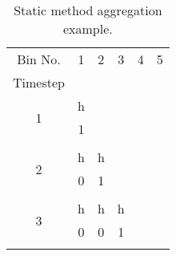 \documentclass[review,12pt]{elsarticle}
\begin{document}
\begin{table}[htbp!]
\centering
\caption{Static method aggregation example.}
\label{tab:static example}
\begin{tabular}{cccccc}
Bin No.                                  & 1                      & 2                      & 3                      & 4                        & 5                        \\
Timestep                                 &                        &                        &                        &                          &                          \\ \cline{1-2}
\multicolumn{1}{|c|}{\multirow{2}{*}{1}} & \multicolumn{1}{c|}{h} &                        &                        &                          &                          \\ \cline{2-2}
\multicolumn{1}{|c|}{}                   & \multicolumn{1}{c|}{1} &                        &                        &                          &                          \\ \cline{1-2}
                                         &                        &                        &                        &                          &                          \\ \cline{1-3}
\multicolumn{1}{|c|}{\multirow{2}{*}{2}} & \multicolumn{1}{c|}{h} & \multicolumn{1}{c|}{h} &                        &                          &                          \\ \cline{2-3}
\multicolumn{1}{|c|}{}                   & \multicolumn{1}{c|}{0} & \multicolumn{1}{c|}{1} &                        &                          &                          \\ \cline{1-3}
                                         &                        &                        &                        &                          &                          \\ \cline{1-4}
\multicolumn{1}{|c|}{\multirow{2}{*}{3}} & \multicolumn{1}{c|}{h} & \multicolumn{1}{c|}{h} & \multicolumn{1}{c|}{h} &                          &                          \\ \cline{2-4}
\multicolumn{1}{|c|}{}                   & \multicolumn{1}{c|}{0} & \multicolumn{1}{c|}{0} & \multicolumn{1}{c|}{1} &                          &                          \\ \cline{1-4}
                                         &                        &                        &                        &                          &                          \\ \cline{1-5}

\end{tabular}
\end{table}
\end{document}
